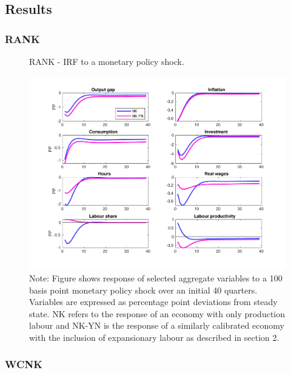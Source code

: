 \documentclass[12pt]{article}
\begin{document}
\subsection{Results}
\subsubsection{RANK}

\begin{figure}
\centering
\caption{\label{fig:IRF_RANK} RANK - IRF to a monetary policy shock.}
\includegraphics[width=14cm]{IRF_RANK.pdf}
\caption*{\RaggedRight \footnotesize Note: Figure shows response of selected aggregate variables to a 100 basis point monetary policy shock over an initial 40 quarters. Variables are expressed as percentage point deviations from steady state. NK refers to the response of an economy with only production labour and NK-YN is the response of a similarly calibrated economy with the inclusion of expansionary labour as described in section 2.}
\end{figure}

\subsubsection{WCNK}
\end{document}

